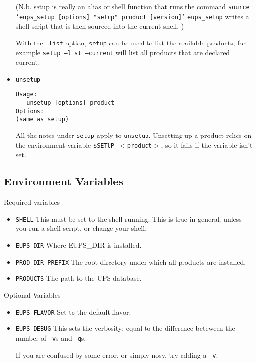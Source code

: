 \documentclass{article}
\begin{document}
\begin{itemize}
(N.b. setup is really an alias or shell function that runs the command\hfil\break
\texttt{source `eups\_setup [options] "setup" product [version]`}\hfil\break
\texttt{eups\_setup} writes a shell script that is then sourced into the
current shell.
)

With the \texttt{--list} option, \texttt{setup} can be used to list the available
products; for example \texttt{setup --list --current} will list all products that
are declared current.


\item \texttt{unsetup}
\begin{verbatim}
Usage:
   unsetup [options] product
Options:
(same as setup)
\end{verbatim}
  
All the notes under \texttt{setup} apply to
\texttt{unsetup}. Unsetting up a product relies on the environment
variable \texttt{\$SETUP\_$<$product$>$}, so it fails if the variable
isn't set.

\end{itemize}

\subsection{Environment Variables}

Required variables -

\begin{itemize}
  \item \texttt{SHELL}
    This must be set to the shell running. This is true in general, unless
    you run a shell script, or change your shell.

  \item \texttt{EUPS\_DIR}
    Where EUPS\_DIR is installed.

  \item \texttt{PROD\_DIR\_PREFIX}
    The root directory under which all products are installed.

  \item \texttt{PRODUCTS}
    The path to the UPS database.
\end{itemize}

Optional Variables -

\begin{itemize}
  \item \texttt{EUPS\_FLAVOR}
    Set to the default flavor.

  \item \texttt{EUPS\_DEBUG}
    This sets the verbosity; equal to the difference beteween the number of \texttt{-v}s
    and \texttt{-q}s.

    If you are confused by some error, or simply nosy, try adding a \texttt{-v}.
\end{itemize}
\end{document}
